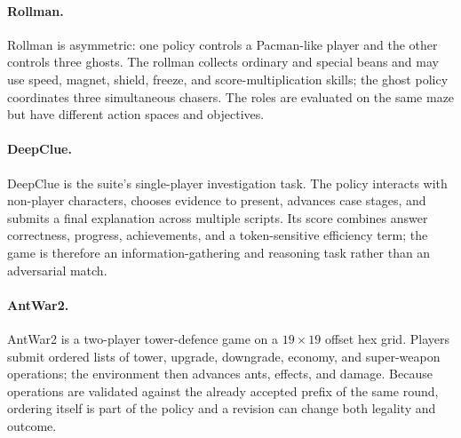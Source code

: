\paragraph{Rollman.} Rollman is asymmetric: one policy controls a Pacman-like player and
the other controls three ghosts. The rollman collects ordinary and special beans and may
use speed, magnet, shield, freeze, and score-multiplication skills; the ghost policy
coordinates three simultaneous chasers. The roles are evaluated on the same maze but have
different action spaces and objectives.

\paragraph{DeepClue.} DeepClue is the suite's single-player investigation task. The policy
interacts with non-player characters, chooses evidence to present, advances case stages,
and submits a final explanation across multiple scripts. Its score combines answer
correctness, progress, achievements, and a token-sensitive efficiency term; the game is
therefore an information-gathering and reasoning task rather than an adversarial match.

\paragraph{AntWar2.} AntWar2 is a two-player tower-defence game on a $19\times19$ offset
hex grid. Players submit ordered lists of tower, upgrade, downgrade, economy, and
super-weapon operations; the environment then advances ants, effects, and damage. Because
operations are validated against the already accepted prefix of the same round, ordering
itself is part of the policy and a revision can change both legality and outcome.
